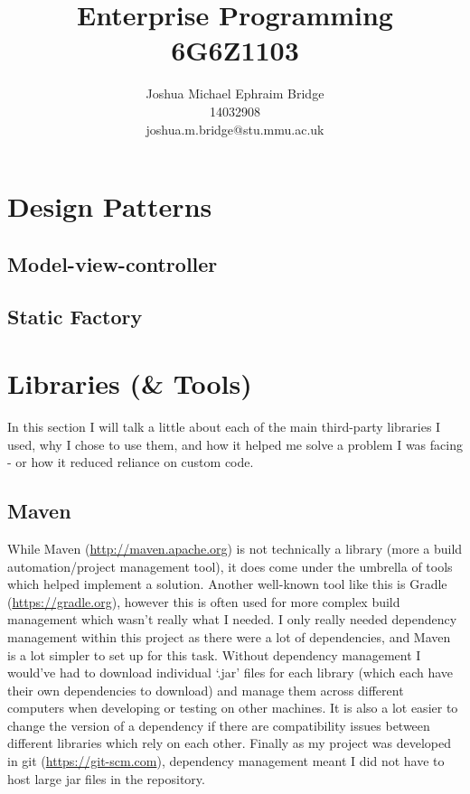 \documentclass[12pt]{article}
\title{\vspace{2cm}\textbf{Enterprise Programming}\\6G6Z1103}
\author{Joshua Michael Ephraim Bridge\\14032908\\joshua.m.bridge@stu.mmu.ac.uk}
\begin{document}
\maketitle

\tableofcontents

\newpage

\section{Design Patterns}
  \subsection{Model-view-controller}
  \subsection{Static Factory}

\section{Libraries (\& Tools)}
  In this section I will talk a little about each of the main third-party libraries I used, why I chose to use them, and how it helped me solve a problem I was facing - or how it reduced reliance on custom code.

  \subsection{Maven}
    While Maven (\url{http://maven.apache.org}) is not technically a library (more a build automation/project management tool), it does come under the umbrella of tools which helped implement a solution. Another well-known tool like this is Gradle (\url{https://gradle.org}), however this is often used for more complex build management which wasn't really what I needed. I only really needed dependency management within this project as there were a lot of dependencies, and Maven is a lot simpler to set up for this task. Without dependency management I would've had to download individual ‘.jar’ files for each library (which each have their own dependencies to download) and manage them across different computers when developing or testing on other machines. It is also a lot easier to change the version of a dependency if there are compatibility issues between different libraries which rely on each other. Finally as my project was developed in git (\url{https://git-scm.com}), dependency management meant I did not have to host large jar files in the repository.
\end{document}
